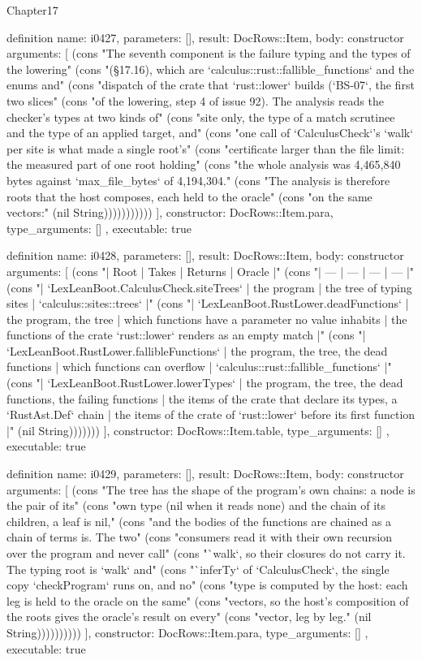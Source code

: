\begin{lexlean}{Chapter17}
\begin{semanticmodule}
definition{
  name: i0427,
  parameters: [],
  result: DocRows::Item,
  body: constructor{
    arguments: [
      (cons "The seventh component is the failure typing and the types of the lowering" (cons "(§17.16), which are `calculus::rust::fallible_functions` and the enums and" (cons "dispatch of the crate that `rust::lower` builds (`BS-07`, the first two slices" (cons "of the lowering, step 4 of issue 92). The analysis reads the checker's types at two kinds of" (cons "site only, the type of a match scrutinee and the type of an applied target, and" (cons "one call of `CalculusCheck`'s `walk` per site is what made a single root's" (cons "certificate larger than the file limit: the measured part of one root holding" (cons "the whole analysis was 4,465,840 bytes against `max_file_bytes` of 4,194,304." (cons "The analysis is therefore roots that the host composes, each held to the oracle" (cons "on the same vectors:" (nil String)))))))))))
    ],
    constructor: DocRows::Item.para,
    type_arguments: []
  },
  executable: true
}

definition{
  name: i0428,
  parameters: [],
  result: DocRows::Item,
  body: constructor{
    arguments: [
      (cons "| Root | Takes | Returns | Oracle |" (cons "| --- | --- | --- | --- |" (cons "| `LexLeanBoot.CalculusCheck.siteTrees` | the program | the tree of typing sites | `calculus::sites::trees` |" (cons "| `LexLeanBoot.RustLower.deadFunctions` | the program, the tree | which functions have a parameter no value inhabits | the functions of the crate `rust::lower` renders as an empty match |" (cons "| `LexLeanBoot.RustLower.fallibleFunctions` | the program, the tree, the dead functions | which functions can overflow | `calculus::rust::fallible_functions` |" (cons "| `LexLeanBoot.RustLower.lowerTypes` | the program, the tree, the dead functions, the failing functions | the items of the crate that declare its types, a `RustAst.Def` chain | the items of the crate of `rust::lower` before its first function |" (nil String)))))))
    ],
    constructor: DocRows::Item.table,
    type_arguments: []
  },
  executable: true
}

definition{
  name: i0429,
  parameters: [],
  result: DocRows::Item,
  body: constructor{
    arguments: [
      (cons "The tree has the shape of the program's own chains: a node is the pair of its" (cons "own type (nil when it reads none) and the chain of its children, a leaf is nil," (cons "and the bodies of the functions are chained as a chain of terms is. The two" (cons "consumers read it with their own recursion over the program and never call" (cons "`walk`, so their closures do not carry it. The typing root is `walk` and" (cons "`inferTy` of `CalculusCheck`, the single copy `checkProgram` runs on, and no" (cons "type is computed by the host: each leg is held to the oracle on the same" (cons "vectors, so the host's composition of the roots gives the oracle's result on every" (cons "vector, leg by leg." (nil String))))))))))
    ],
    constructor: DocRows::Item.para,
    type_arguments: []
  },
  executable: true
}


\end{semanticmodule}
\end{lexlean}
